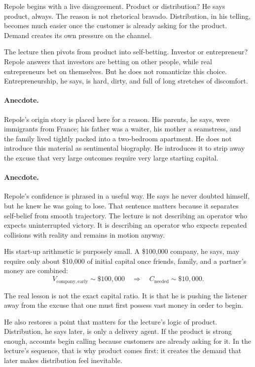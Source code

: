 Repole begins with a live disagreement. Product or distribution? He says product, always. The reason is not rhetorical bravado. Distribution, in his telling, becomes much easier once the customer is already asking for the product. Demand creates its own pressure on the channel.

The lecture then pivots from product into self-betting. Investor or entrepreneur? Repole answers that investors are betting on other people, while real entrepreneurs bet on themselves. But he does not romanticize this choice. Entrepreneurship, he says, is hard, dirty, and full of long stretches of discomfort.

\paragraph{Anecdote.}
Repole's origin story is placed here for a reason. His parents, he says, were immigrants from France; his father was a waiter, his mother a seamstress, and the family lived tightly packed into a two-bedroom apartment. He does not introduce this material as sentimental biography. He introduces it to strip away the excuse that very large outcomes require very large starting capital.

\paragraph{Anecdote.}
Repole's confidence is phrased in a useful way. He says he never doubted himself, but he knew he was going to lose. That sentence matters because it separates self-belief from smooth trajectory. The lecture is not describing an operator who expects uninterrupted victory. It is describing an operator who expects repeated collisions with reality and remains in motion anyway.

His start-up arithmetic is purposely small. A \$100{,}000 company, he says, may require only about \$10{,}000 of initial capital once friends, family, and a partner's money are combined:
\begin{equation}
V_{\mathrm{company,early}} \sim \$100{,}000
\quad \Rightarrow \quad
C_{\mathrm{needed}} \sim \$10{,}000.
\end{equation}

The real lesson is not the exact capital ratio. It is that he is pushing the listener away from the excuse that one must first possess vast money in order to begin.

He also restores a point that matters for the lecture's logic of product. Distribution, he says later, is only a delivery agent. If the product is strong enough, accounts begin calling because customers are already asking for it. In the lecture's sequence, that is why product comes first: it creates the demand that later makes distribution feel inevitable.

